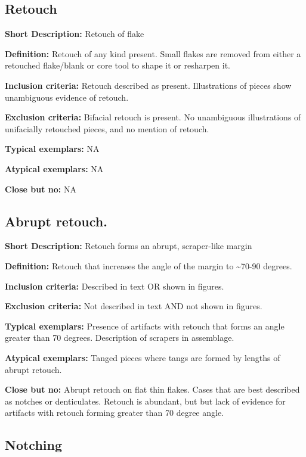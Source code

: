 \documentclass[
]{article}
\begin{document}
\hypertarget{retouch}{%
\subsection{Retouch}\label{retouch}}

\textbf{Short Description:} Retouch of flake

\textbf{Definition:} Retouch of any kind present. Small flakes are
removed from either a retouched flake/blank or core tool to shape it or
resharpen it.

\textbf{Inclusion criteria:} Retouch described as present. Illustrations
of pieces show unambiguous evidence of retouch.

\textbf{Exclusion criteria:} Bifacial retouch is present. No unambiguous
illustrations of unifacially retouched pieces, and no mention of
retouch.

\textbf{Typical exemplars:} NA

\textbf{Atypical exemplars:} NA

\textbf{Close but no:} NA

\hypertarget{abrupt-retouch.}{%
\subsection{Abrupt retouch.}\label{abrupt-retouch.}}

\textbf{Short Description:} Retouch forms an abrupt, scraper-like margin

\textbf{Definition:} Retouch that increases the angle of the margin to
\textasciitilde70-90 degrees.

\textbf{Inclusion criteria:} Described in text OR shown in figures.

\textbf{Exclusion criteria:} Not described in text AND not shown in
figures.

\textbf{Typical exemplars:} Presence of artifacts with retouch that
forms an angle greater than 70 degrees. Description of scrapers in
assemblage.

\textbf{Atypical exemplars:} Tanged pieces where tangs are formed by
lengths of abrupt retouch.

\textbf{Close but no:} Abrupt retouch on flat thin flakes. Cases that
are best described as notches or denticulates. Retouch is abundant, but
but lack of evidence for artifacts with retouch forming greater than 70
degree angle.

\hypertarget{notching}{%
\subsection{Notching}\label{notching}}
\end{document}
